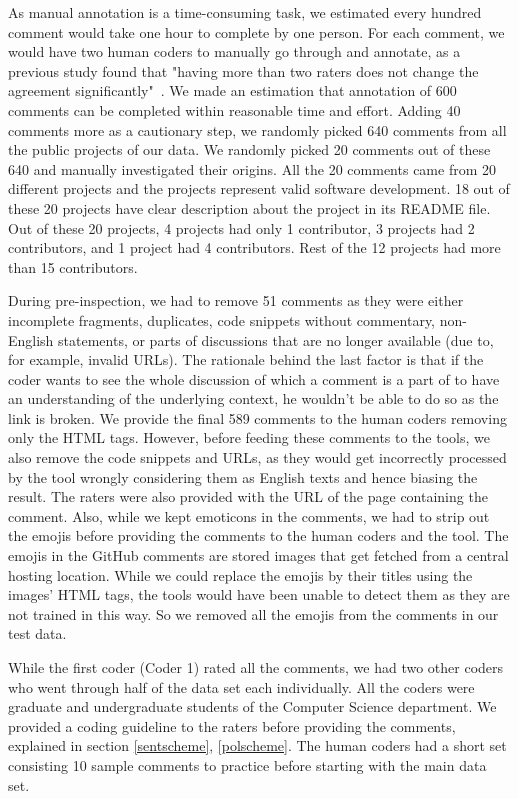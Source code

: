 As manual annotation is a time-consuming task, we estimated 
every hundred comment 
would take one hour to complete by one person. For each comment, we would have two human coders to manually go through and annotate, as a previous study found that "having more than two raters does not change the agreement significantly"~\cite{murgia2014developers}. We made an estimation that annotation of 600 comments can be completed within reasonable time and effort.
Adding 40 comments more as a cautionary step, 
we randomly picked 640 comments 
from all the public projects of our data.
We randomly picked 
20 comments out of these 640 and 
manually investigated their origins.
All the 20 comments came from 20 different projects 
and the projects represent valid software development.
18 out of these 20 projects have clear description 
about the project in its README file.
Out of these 20 projects, 
4 projects had only 1 contributor, 
3 projects had 2 contributors, 
and 1 project had 4 contributors.
Rest of the 12 projects had more than 15 contributors.

During pre-inspection, we had to remove 51 comments as they were either incomplete fragments, duplicates, code snippets without commentary, non-English statements, or parts of discussions that are no longer available (due to, for example, invalid URLs). The rationale behind the last factor is that if the coder wants to see the whole discussion of which a comment is a part of to have an understanding of the underlying context, he wouldn't be able to do so as the link is broken. We provide the final 589 comments to the human coders removing only the HTML tags. However, before feeding these comments to the tools, we also remove the code snippets and URLs, as they would get incorrectly processed by the tool wrongly considering them as English texts and hence biasing the result. The raters were also provided with the URL of the page containing the comment.
Also, while we kept emoticons in the comments, 
we had to strip out the emojis 
before providing the comments 
to the human coders and the tool.
The emojis in the GitHub comments 
are stored images 
that get fetched from a central hosting location.
While we could replace the emojis 
by their titles using the images' HTML tags, 
the tools would have been unable to detect them 
as they are not trained in this way.
So we removed all the emojis 
from the comments in our test data.

While the first coder (Coder 1) rated all the comments, we had two other coders who went through half of the data set each individually. All the coders were graduate and undergraduate students 
of the Computer Science department. 
We provided a coding guideline to the raters before providing the comments, explained in section \ref{sentscheme}, \ref{polscheme}. 
The human coders had a short set 
consisting 10 sample comments 
to practice before starting 
with the main data set.

